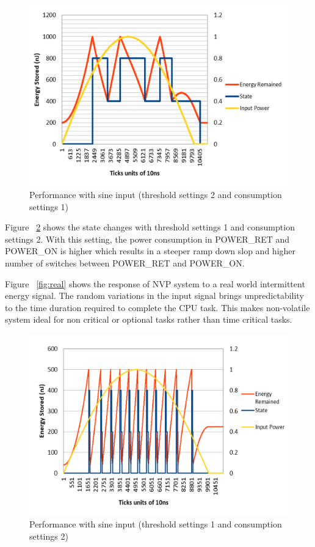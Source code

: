 \documentclass[conference]{IEEEtran}
\begin{document}
\begin{figure}[htbp]
\centerline{\includegraphics[scale=0.3]{sinediffthresh3.png}}
\caption{Performance with sine input (threshold settings 2 and consumption settings 1)}
\label{sinediffthresh3}
\end{figure}

Figure ~\ref{sinediffcons3} shows the state changes with threshold settings 1 and consumption settings 2. With this setting, the power consumption in POWER\_RET and POWER\_ON is higher which results in a steeper ramp down slop and higher number of switches between POWER\_RET and POWER\_ON. 

Figure ~\ref{fig:real} shows the response of NVP system to a real world intermittent energy signal. The random variations in the input signal brings unpredictability to the time duration required to complete the CPU task. This makes non-volatile system ideal for non critical or optional tasks rather than time critical tasks.

\begin{figure}[htbp]
\centerline{\includegraphics[scale=0.3]{sinediffcons3.png}}
\caption{Performance with sine input (threshold settings 1 and consumption settings 2)}
\label{sinediffcons3}
\end{figure}
\end{document}
